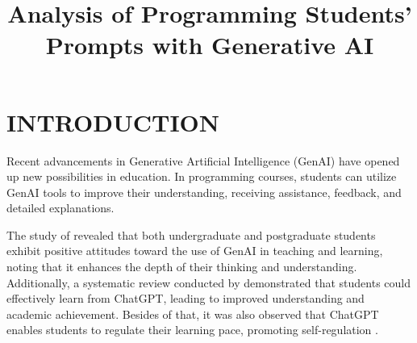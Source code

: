 \documentclass[a4paper,twoside]{article}
\begin{document}
\title{Analysis of Programming Students' Prompts with Generative AI}

\author{
}



\twocolumn\maketitle\normalsize\setcounter{footnote}{0}

\section{\uppercase{Introduction}}
\label{sec:introduction}


Recent advancements in Generative Artificial Intelligence (GenAI) have opened
up new possibilities in education. In programming courses, students can utilize
GenAI tools to improve their understanding, receiving assistance, feedback, and
detailed explanations.

The study of \cite{chan23} revealed that both undergraduate and postgraduate
students exhibit positive attitudes toward the use of GenAI in teaching and
learning, noting that it enhances the depth of their thinking and understanding.
Additionally, a systematic review conducted by \cite{Lo24} demonstrated that
students could effectively learn from ChatGPT, leading to improved understanding
and academic achievement. Besides of that, it was also observed that ChatGPT
enables students to regulate their learning pace, promoting self-regulation
\citep{Baha24} \citep{cai23}.
\end{document}
